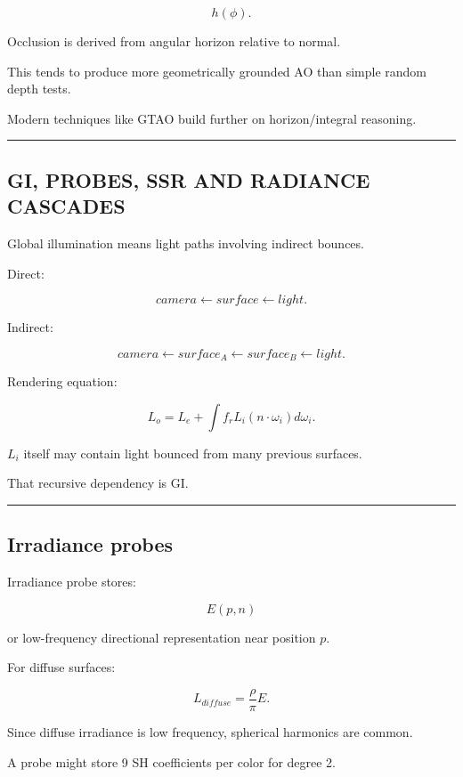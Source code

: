 \[
h(\phi).
\]

Occlusion is derived from angular horizon relative to normal.

This tends to produce more geometrically grounded AO than simple random depth tests.

Modern techniques like GTAO build further on horizon/integral reasoning.

\begin{center}\rule{0.5\linewidth}{0.5pt}\end{center}

\subsection{GI, PROBES, SSR AND RADIANCE CASCADES}\label{04-visual-computing-ii-ch040-gi-probes-ssr-and-radiance-cascades}

Global illumination means light paths involving indirect bounces.

Direct:

\[
camera
\leftarrow
surface
\leftarrow
light.
\]

Indirect:

\[
camera
\leftarrow
surface_A
\leftarrow
surface_B
\leftarrow
light.
\]

Rendering equation:

\[
L_o=
L_e+
\int
f_rL_i(n\cdot\omega_i)d\omega_i.
\]

\(L_i\) itself may contain light bounced from many previous surfaces.

That recursive dependency is GI.

\begin{center}\rule{0.5\linewidth}{0.5pt}\end{center}

\subsection{Irradiance probes}\label{04-visual-computing-ii-ch040-irradiance-probes}

Irradiance probe stores:

\[
E(p,n)
\]

or low-frequency directional representation near position \(p\).

For diffuse surfaces:

\[
L_{diffuse}
=
\frac{\rho}{\pi}
E.
\]

Since diffuse irradiance is low frequency, spherical harmonics are common.

A probe might store 9 SH coefficients per color for degree 2.

